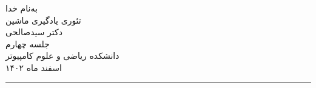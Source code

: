 \begin{minipage}{0.1\textwidth}
\end{minipage}%
\hfill%
\begin{minipage}{0.6\textwidth}\centering
\fontsize{10pt}{10pt}\selectfont
به‌نام خدا \\
تئوری یادگیری ماشین \\
دکتر سیدصالحی \\
جلسه چهارم \\
\vspace{0.25cm}
\begingroup
\fontsize{8pt}{8pt}\selectfont
دانشکده ریاضی و علوم کامپیوتر \\
اسفند ماه ۱۴۰۲\\
\endgroup
\end{minipage}%
\hfill%
\begin{minipage}{0.1\textwidth}
\end{minipage}

\vspace{0.5cm}

\noindent\rule{\textwidth}{1pt}